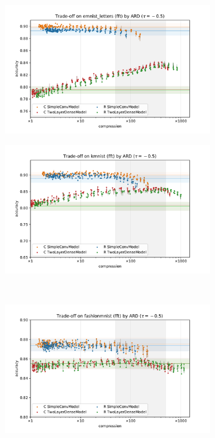 \documentclass[a4paper,10pt]{article}
\begin{document}
\begin{figure}[b]
  \centering
  \begin{subfigure}[b]{0.5\textwidth}
    \centering
    \includegraphics[width=\linewidth]{figure__mnist-like__trade-off/appendix__ARD__emnist_letters__fft__-0.5.pdf}
  \end{subfigure}%
  \begin{subfigure}[b]{0.5\textwidth}
    \centering
    \includegraphics[width=\linewidth]{figure__mnist-like__trade-off/appendix__ARD__kmnist__fft__-0.5.pdf}
  \end{subfigure} \\ %
  \begin{subfigure}[b]{0.5\textwidth}
    \centering
    \includegraphics[width=\linewidth]{figure__mnist-like__trade-off/appendix__ARD__fashionmnist__fft__-0.5.pdf}

\end{subfigure}
\end{figure}
\end{document}

